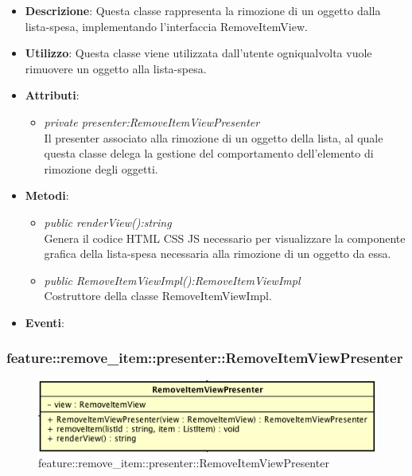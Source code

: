 \begin{itemize}
\item \textbf{Descrizione}: Questa classe rappresenta la rimozione di un oggetto dalla lista-spesa, implementando l'interfaccia RemoveItemView.
\item \textbf{Utilizzo}: Questa classe viene utilizzata dall'utente ogniqualvolta vuole rimuovere un oggetto alla lista-spesa.
\item \textbf{Attributi}: 
	\begin{itemize}
	\item \textit{private presenter:RemoveItemViewPresenter}\\
	Il presenter associato alla rimozione di un oggetto della lista, al quale questa classe delega la gestione del comportamento dell'elemento di rimozione degli oggetti.
	\end{itemize}
\item \textbf{Metodi}:
	\begin{itemize}
	\item \textit{public renderView():string}\\
		Genera il codice HTML CSS JS necessario per visualizzare la componente grafica della lista-spesa necessaria alla rimozione di un oggetto da essa.
	\item \textit{public RemoveItemViewImpl():RemoveItemViewImpl}\\
	Costruttore della classe RemoveItemViewImpl.
	\end{itemize}
\item \textbf{Eventi}:
\end{itemize}

\subsubsection{feature::remove\_item::presenter::RemoveItemViewPresenter}

\label{feature::remove_item::presenter::RemoveItemViewPresenter}
\begin{figure}[ht]
	\centering
	\includegraphics[scale=0.5]{Sezioni/SottosezioniST/img/app/RemoveItemViewPresenter.png}
	\caption{feature::remove\_item::presenter::RemoveItemViewPresenter}
\end{figure}

